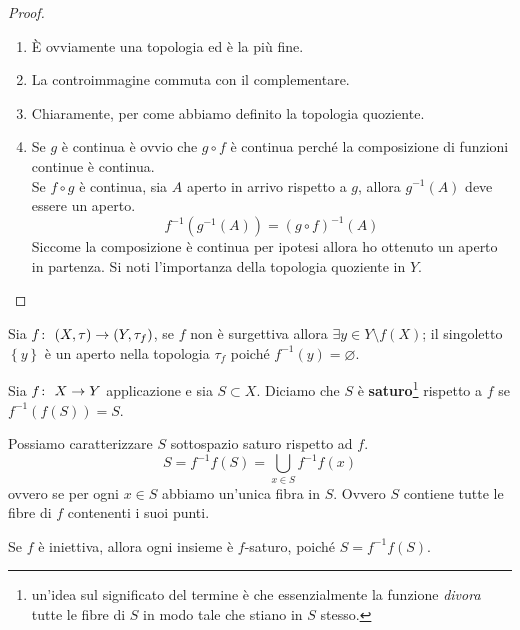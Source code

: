 \begin{proof} \
	\begin{enumerate}
		\item È ovviamente una topologia ed è la più fine. 
		\item La controimmagine commuta con il complementare. 
		\item Chiaramente, per come abbiamo definito la topologia quoziente.
		\item Se $g$ è continua è ovvio che $g \circ f$ è continua perché la composizione di funzioni continue è continua. \\ Se $f\circ g$ è continua, sia $A$ aperto  in arrivo rispetto a $g$, allora $g^{-1}(A)$ deve essere un aperto. 
		\begin{equation*}
		f^{-1}\left(g^{-1}(A)\right)=\left(g \circ f\right)^{-1}(A)
		\end{equation*}
		Siccome la composizione è continua per ipotesi allora ho ottenuto un aperto in partenza. Si noti l'importanza della topologia quoziente in $Y$.
	\end{enumerate}
\end{proof}

\begin{remark}
	Sia $f \colon\ (X, \tau) \rightarrow (Y, \tau_f)$, se $f$ non è surgettiva allora $\exists y \in Y \setminus f(X)$; il singoletto $\left\{y\right\}$ è un aperto nella topologia $\tau_f$ poiché $f^{-1}(y) = \varnothing$.
\end{remark} 

\begin{definition}
	Sia $f \colon\ X \rightarrow Y$ applicazione e sia $S \subset X$. Diciamo che $S$ è \textbf{saturo}\footnote{un'idea sul significato del termine è che essenzialmente la funzione \textit{divora} tutte le fibre di $S$ in modo tale che stiano in $S$ stesso.} rispetto a $f$ se $f^{-1}(f(S)) = S$.
\end{definition} 

\begin{remark}
	Possiamo caratterizzare $S$ sottospazio saturo rispetto ad $f$.
	\begin{equation*}
		S = f^{-1}f(S) = \bigcup_{x \in S} f^{-1}f(x)
	\end{equation*}
	ovvero se per ogni $x \in S$ abbiamo un'unica fibra in $S$. Ovvero $S$ contiene tutte le fibre di $f$ contenenti i suoi punti. 
\end{remark} 

\begin{remark}
	Se $f$ è iniettiva, allora ogni insieme è $f$-saturo, poiché $S = f^{-1}f(S)$.
\end{remark}

